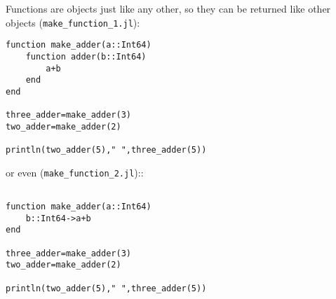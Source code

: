 \documentclass[12pt]{article}
\begin{document}
Functions are objects just like any other, so they can be returned
like other objects (\texttt{make\_function\_1.jl}):
\begin{lstlisting}[numbers=right]
function make_adder(a::Int64)
    function adder(b::Int64)
        a+b
    end
end

three_adder=make_adder(3)
two_adder=make_adder(2)

println(two_adder(5)," ",three_adder(5))
\end{lstlisting}
or even (\texttt{make\_function\_2.jl})::
\begin{lstlisting}[numbers=right]

function make_adder(a::Int64)
    b::Int64->a+b
end

three_adder=make_adder(3)
two_adder=make_adder(2)

println(two_adder(5)," ",three_adder(5))
\end{lstlisting}
\end{document}
